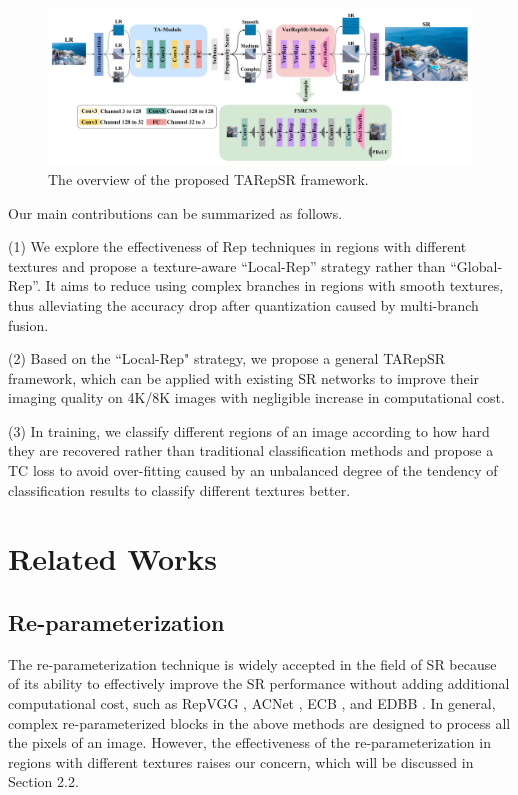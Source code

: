 \documentclass[sn-mathphys]{sn-jnl}%
\theoremstyle{thmstyleone}%
\theoremstyle{thmstyletwo}%
\theoremstyle{thmstylethree}%
\begin{document}
\begin{figure}[htbp]
    \centering
    \includegraphics[width=4.9in]{main-4.png}
    \caption{The overview of the proposed TARepSR framework.}
    \label{TARepSR}
\end{figure}

Our main contributions can be summarized as follows.

(1) We explore the effectiveness of Rep techniques in regions with different textures and propose a texture-aware ``Local-Rep'' strategy rather than ``Global-Rep''. It aims to reduce using complex branches in regions with smooth textures, thus alleviating the accuracy drop after quantization caused by multi-branch fusion.

(2) Based on the ``Local-Rep" strategy, we propose a general TARepSR framework, which can be applied with existing SR networks to improve their imaging quality on 4K/8K images with negligible increase in computational cost.

(3) In training, we classify different regions of an image according to how hard they are recovered rather than traditional classification methods and propose a TC loss to avoid over-fitting caused by an unbalanced degree of the tendency of classification results to classify different textures better.

\section{Related Works}
\subsection{Re-parameterization}
The re-parameterization technique is widely accepted in the field of SR because of its ability to effectively improve the SR performance without adding additional computational cost, such as RepVGG \cite{RepVGG}, ACNet \cite{ACnet}, ECB \cite{ECB}, and EDBB \cite{EDBB}. In general, complex re-parameterized blocks in the above methods are designed to process all the pixels of an image. However, the effectiveness of the re-parameterization in regions with different textures raises our concern, which will be discussed in Section 2.2.
\end{document}
